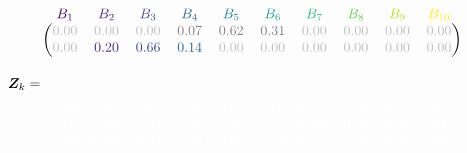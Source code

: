 \scriptsize
$$
\design_k = \begin{blockarray}{cccccccccc}
\color[HTML]{440154}B_{1} & \color[HTML]{482878}B_{2} & \color[HTML]{3E4A89}B_{3} & \color[HTML]{31688E}B_{4} & \color[HTML]{26828E}B_{5} & \color[HTML]{1F9E89}B_{6} & \color[HTML]{35B779}B_{7} & \color[HTML]{6DCD59}B_{8} & \color[HTML]{B4DE2C}B_{9} & \color[HTML]{FDE725}B_{10} \\
\begin{block}{(cccccccccc)}
\color{lightgray}0.00 & \color{lightgray}0.00 & \color{lightgray}0.00 & \color{gray}0.07 & \color{gray}0.62 & \color{gray}0.31 & \color{lightgray}0.00 & \color{lightgray}0.00 & \color{lightgray}0.00 & \color{lightgray}0.00\color{black}\\
  \color{lightgray}0.00 & \color[HTML]{482878}0.20 & \color[HTML]{3E4A89}0.66 & \color[HTML]{31688E}0.14 & \color{lightgray}0.00 & \color{lightgray}0.00 & \color{lightgray}0.00 & \color{lightgray}0.00 & \color{lightgray}0.00 & \color{lightgray}0.00\color{black}\\
  
\end{block}
\color{white}0.00 & \color{white}0.00 & \color{white}0.00 & \color{white}0.00 & \color{white}0.00 & \color{white}0.00 & \color{white}0.00 & \color{white}0.17 & \color{white}0.67 & \color{white}0.17\color{black}\\
  \color{white}\vdots & \color{white}\vdots & \color{white}\vdots & \color{white}\vdots & \color{white}\vdots & \color{white}\vdots & \color{white}\vdots & \color{white}\vdots & \color{white}\vdots & \color{white}\vdots\\
  \color{white}0.00 & \color{white}0.02 & \color{white}0.48 & \color{white}0.48 & \color{white}0.02 & \color{white}0.00 & \color{white}0.00 & \color{white}0.00 & \color{white}0.00 & \color{white}0.00\color{black}\\
  \color{white}0.00 & \color{white}0.00 & \color{white}0.00 & \color{white}0.01 & \color{white}0.40 & \color{white}0.55 & \color{white}0.04 & \color{white}0.00 & \color{white}0.00 & \color{white}0.00\color{black}\\
  \color{white}0.00 & \color{white}0.00 & \color{white}0.00 & \color{white}0.00 & \color{white}0.00 & \color{white}0.29 & \color{white}0.63 & \color{white}0.08 & \color{white}0.00 & \color{white}0.00\color{black}
\end{blockarray}
$$
\normalsize
